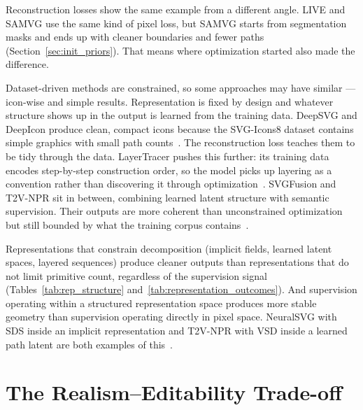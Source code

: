 Reconstruction losses show the same example from a different 
angle. LIVE and SAMVG use the same kind of pixel loss, but SAMVG starts 
from segmentation masks and ends up with cleaner boundaries and fewer 
paths (Section~\ref{sec:init_priors}). 
That means where optimization started also made the difference.

Dataset-driven methods are constrained, so some approaches may have similar --- icon-wise and simple results. 
Representation is fixed by design and whatever structure 
shows up in the output is learned from the training data.
DeepSVG and DeepIcon produce clean, compact 
icons because the SVG-Icons8 dataset contains simple graphics 
with small path 
counts~\cite{carlierDeepSVGHierarchicalGenerative2020}. The 
reconstruction loss teaches them to be tidy through the data.
LayerTracer pushes this further: its training data 
encodes step-by-step construction order, so the model picks 
up layering as a convention rather than discovering it through 
optimization~\cite{songLayerTracerCognitiveAlignedLayered2025}. 
SVGFusion and T2V-NPR sit in between, combining learned 
latent structure with semantic supervision. Their outputs are 
more coherent than unconstrained optimization but still 
bounded by what the training corpus 
contains~\cite{xingSVGFusionScalableTexttoSVG2025, 
zhangTexttoVectorGenerationNeural2024}.

Representations that constrain 
decomposition (implicit fields, learned latent spaces, layered 
sequences) produce cleaner outputs than 
representations that do not limit primitive count, 
regardless of the supervision signal 
(Tables~\ref{tab:rep_structure} and~\ref{tab:representation_outcomes}). And supervision operating 
within a structured representation space produces more stable 
geometry than supervision operating directly in pixel space. 
NeuralSVG with SDS inside an implicit representation and 
T2V-NPR with VSD inside a learned path latent are both 
examples of this~\cite{polaczekNeuralSVGImplicitRepresentation2025, 
zhangTexttoVectorGenerationNeural2024}.

\section{The Realism--Editability Trade-off}
\label{sec:tradeoff}

